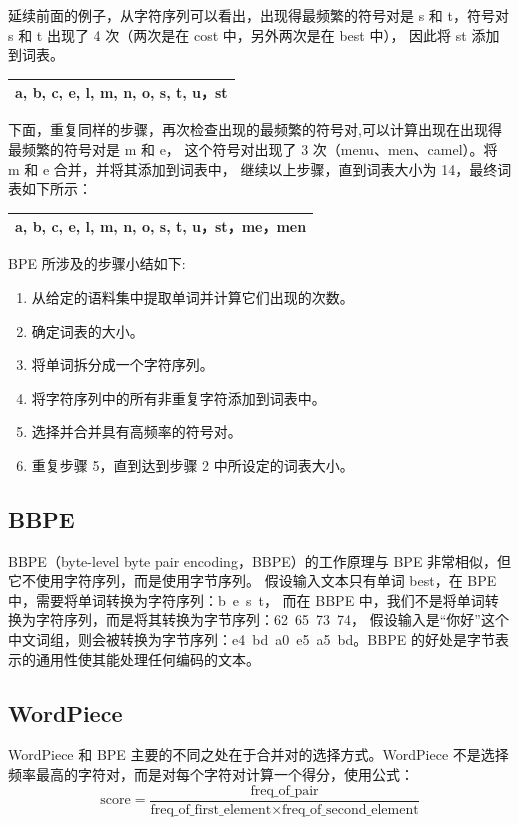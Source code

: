 延续前面的例子，从字符序列可以看出，出现得最频繁的符号对是 s 和 t，符号对 s 和 t 出现了 4 次（两次是在 cost 中，另外两次是在 best 中），
因此将 st 添加到词表。

\begin{table}[H]
	\centering
	\begin{tabular}{|l|}
		\hline
		a, b, c, e, l, m, n, o, s, t, u，st \\
		\hline
	\end{tabular}
\end{table}

下面，重复同样的步骤，再次检查出现的最频繁的符号对,可以计算出现在出现得最频繁的符号对是 m 和 e，
这个符号对出现了 3 次（menu、men、camel）。将 m 和 e 合并，并将其添加到词表中，
继续以上步骤，直到词表大小为 14，最终词表如下所示：

\begin{table}[H]
	\centering
	\begin{tabular}{|l|}
		\hline
		a, b, c, e, l, m, n, o, s, t, u，st，me，men \\
		\hline
	\end{tabular}
\end{table}

BPE 所涉及的步骤小结如下:

\begin{enumerate}
	\item 从给定的语料集中提取单词并计算它们出现的次数。
	\item 确定词表的大小。
	\item 将单词拆分成一个字符序列。
	\item 将字符序列中的所有非重复字符添加到词表中。
	\item 选择并合并具有高频率的符号对。
	\item 重复步骤 5，直到达到步骤 2 中所设定的词表大小。
\end{enumerate}

\subsection{BBPE}
BBPE（byte-level byte pair encoding，BBPE）的工作原理与 BPE 非常相似，但它不使用字符序列，而是使用字节序列。
假设输入文本只有单词 best，在 BPE 中，需要将单词转换为字符序列：b~e~s~t，
而在 BBPE 中，我们不是将单词转换为字符序列，而是将其转换为字节序列：62~65~73~74，
假设输入是“你好”这个中文词组，则会被转换为字节序列：e4~bd~a0~e5~a5~bd。BBPE 的好处是字节表示的通用性使其能处理任何编码的文本。

\subsection{WordPiece}
WordPiece 和 BPE 主要的不同之处在于合并对的选择方式。WordPiece 不是选择频率最高的字符对，而是对每个字符对计算一个得分，使用公式：
\[
	\text{score} = \frac{\text{freq\_of\_pair}}{\text{freq\_of\_first\_element} \times \text{freq\_of\_second\_element}}
\]
